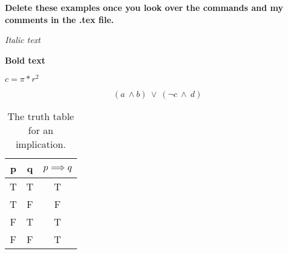 \documentclass[11pt]{article}
\begin{document}
\raggedright

\newcommand\NAME{Jane Doe}  %
\newcommand\UID{u0123456}     %
\newcommand\HWNUM{1}              %


\textbf{\large{Delete these examples once you look over the commands and my comments in the .tex file.}}

\textit{Italic text} %

\textbf{Bold text} %

$c = \pi * r^2$ %

$$ (a \ \land b) \ \lor \ (\neg c \ \land \ d) $$ %



\begin{table}[H]
\centering
{\renewcommand{\arraystretch}{1.2}
\begin{tabular}{| c | c | c |} %
\hline
p & q & $p \implies q$\\ %
\hline
T & T & T \\ \hline %
T & F & F \\ \hline %
F & T & T \\ \hline %
F & F & T \\ \hline %
\end{tabular}}
\caption{The truth table for an implication.}
\end{table}
\end{document}
